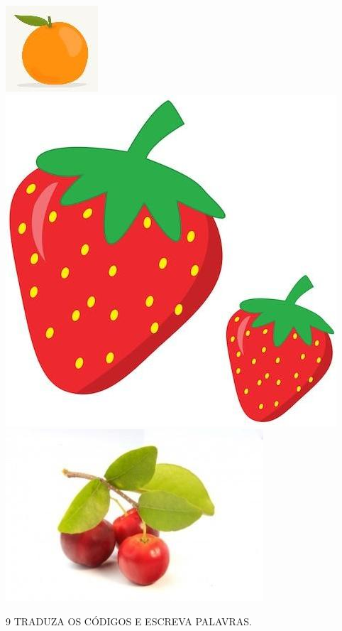 \includegraphics[width=.2\textwidth]{media/image101.jpg}
\includegraphics[width=.2\textwidth]{media/image102.jpg}
\includegraphics[width=.3\textwidth]{media/image103.jpg}



\num{9} TRADUZA OS CÓDIGOS E ESCREVA PALAVRAS.

